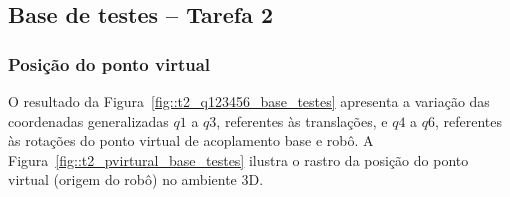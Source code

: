 \subsection{Base de testes -- Tarefa 2}

\subsubsection{Posição do ponto virtual}

O resultado da Figura~\ref{fig::t2_q123456_base_testes} apresenta a variação das
coordenadas generalizadas $q1$ a $q3$, referentes às translações, e $q4$ a $q6$,
referentes às rotações do ponto virtual de acoplamento base e robô. A
Figura~\ref{fig::t2_pvirtural_base_testes} ilustra o rastro da posição do ponto
virtual (origem do robô) no ambiente 3D.

